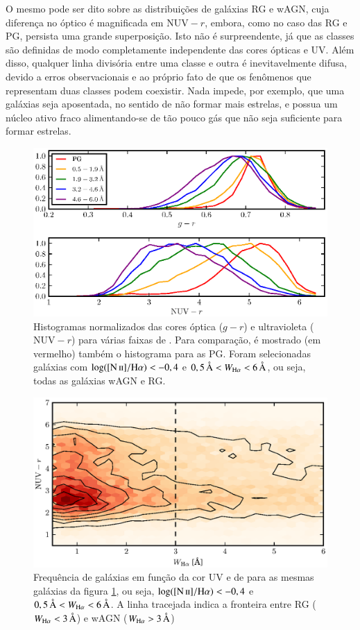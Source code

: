 O mesmo pode ser dito sobre as distribuições de galáxias RG e wAGN, cuja
diferença no óptico é magnificada em $\mathrm{NUV}-r$, embora, como no caso das
RG e PG, persista uma grande superposição. Isto não é surpreendente, já que as
classes são definidas de modo completamente independente das cores ópticas e UV.
Além disso, qualquer linha divisória entre uma classe e outra é inevitavelmente
difusa, devido a erros observacionais e ao próprio fato de que os fenômenos que
representam duas classes podem coexistir. Nada impede, por exemplo, que uma
galáxias seja aposentada, no sentido de não formar mais estrelas, e possua um
núcleo ativo fraco alimentando-se de tão pouco gás que não seja suficiente para
formar estrelas.

\begin{figure}
	\includegraphics{figuras/histo_wha_color.eps}
	\caption[Histogramas de cores em função de \WHa.]
	{Histogramas normalizados das cores óptica ($g-r$) e ultravioleta
	($\mathrm{NUV}-r$) para várias faixas de \WHa. Para comparação, é mostrado (em
	vermelho) também o histograma para as PG. Foram selecionadas galáxias com
	$\log(\nII/\Halpha) < -0,4$ e $0,5\,\text{\AA} < \WHa < 6\,\text{\AA}$, ou
	seja, todas as galáxias wAGN e RG.}
	\label{fig:HistogramaCorWHa}
\end{figure}

\begin{figure}
	\includegraphics{figuras/wha_nuv.eps}
	\caption[Cor UV em função de \WHa.]
	{Frequência de galáxias em função da cor UV e de \WHa para as mesmas
	galáxias da figura \ref{fig:HistogramaCorWHa}, ou seja, $\log(\nII/\Halpha) <
	-0,4$ e $0,5\,\text{\AA} < \WHa < 6\,\text{\AA}$. A linha tracejada indica a
	fronteira entre RG ($\WHa < 3\,\text{\AA}$) e wAGN ($\WHa > 3\,\text{\AA}$)}
	\label{fig:ColorWha}
\end{figure}

